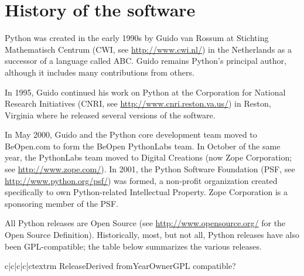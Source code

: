 \section{History of the software}

Python was created in the early 1990s by Guido van Rossum at Stichting
Mathematisch Centrum (CWI, see \url{http://www.cwi.nl/}) in the Netherlands
as a successor of a language called ABC.  Guido remains Python's
principal author, although it includes many contributions from others.

In 1995, Guido continued his work on Python at the Corporation for
National Research Initiatives (CNRI, see \url{http://www.cnri.reston.va.us/})
in Reston, Virginia where he released several versions of the
software.

In May 2000, Guido and the Python core development team moved to
BeOpen.com to form the BeOpen PythonLabs team.  In October of the same
year, the PythonLabs team moved to Digital Creations (now Zope
Corporation; see \url{http://www.zope.com/}).  In 2001, the Python
Software Foundation (PSF, see \url{http://www.python.org/psf/}) was
formed, a non-profit organization created specifically to own
Python-related Intellectual Property.  Zope Corporation is a
sponsoring member of the PSF.

All Python releases are Open Source (see
\url{http://www.opensource.org/} for the Open Source Definition).
Historically, most, but not all, Python releases have also been
GPL-compatible; the table below summarizes the various releases.

\begin{tablev}{c|c|c|c|c}{textrm}%
  {Release}{Derived from}{Year}{Owner}{GPL compatible?}
\end{tablev}


